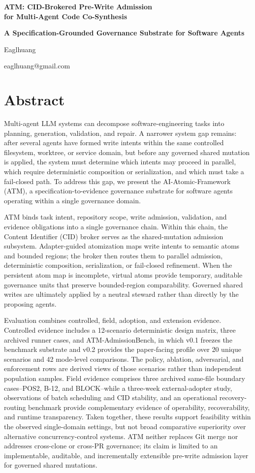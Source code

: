 \documentclass[9pt,letterpaper]{extarticle}
\makeatletter
\newcommand{\paperTitleBlock}{%
  \begin{center}
    {\fontsize{18}{22}\selectfont\bfseries
    ATM: CID-Brokered Pre-Write Admission\\
    for Multi-Agent Code Co-Synthesis\par}
    \vspace{2.5pt}
    {\fontsize{10}{12}\selectfont\bfseries
    A Specification-Grounded Governance Substrate for Software Agents\par}
    \vspace{12pt}
    {\fontsize{11}{13}\selectfont Eaglhuang\par}
    {\fontsize{10}{12}\selectfont eaglhuang@gmail.com\par}
  \end{center}
  \vspace{4pt}
}
\makeatother
\begin{document}
\paperTitleBlock

\section*{Abstract}

Multi-agent LLM systems can decompose software-engineering tasks into planning, generation, validation, and repair. A narrower system gap remains: after several agents have formed write intents within the same controlled filesystem, worktree, or service domain, but before any governed shared mutation is applied, the system must determine which intents may proceed in parallel, which require deterministic composition or serialization, and which must take a fail-closed path. To address this gap, we present the AI-Atomic-Framework (ATM), a specification-to-evidence governance substrate for software agents operating within a single governance domain.

ATM binds task intent, repository scope, write admission, validation, and evidence obligations into a single governance chain. Within this chain, the Content Identifier (CID) broker serves as the shared-mutation admission subsystem. Adapter-guided atomization maps write intents to semantic atoms and bounded regions; the broker then routes them to parallel admission, deterministic composition, serialization, or fail-closed refinement. When the persistent atom map is incomplete, virtual atoms provide temporary, auditable governance units that preserve bounded-region comparability. Governed shared writes are ultimately applied by a neutral steward rather than directly by the proposing agents.

Evaluation combines controlled, field, adoption, and extension evidence. Controlled evidence includes a 12-scenario deterministic design matrix, three archived runner cases, and ATM-AdmissionBench, in which v0.1 freezes the benchmark substrate and v0.2 provides the paper-facing profile over 20 unique scenarios and 42 mode-level comparisons. The policy, ablation, adversarial, and enforcement rows are derived views of those scenarios rather than independent population samples. Field evidence comprises three archived same-file boundary cases--POS2, B-12, and BLOCK--while a three-week external-adopter study, observations of batch scheduling and CID stability, and an operational recovery-routing benchmark provide complementary evidence of operability, recoverability, and runtime transparency. Taken together, these results support feasibility within the observed single-domain settings, but not broad comparative superiority over alternative concurrency-control systems. ATM neither replaces Git merge nor addresses cross-clone or cross-PR governance; its claim is limited to an implementable, auditable, and incrementally extensible pre-write admission layer for governed shared mutations.
\end{document}
